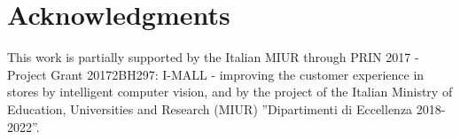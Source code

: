 \documentclass[a4paper,conference]{IEEEtran}
\begin{document}
 \section{Acknowledgments}
\vspace{-0.1cm}
This work is partially supported by the Italian MIUR through PRIN 2017 - Project Grant 20172BH297: I-MALL - improving the customer experience in stores by intelligent computer vision, and  by  the  project  of  the  Italian  Ministry  of  Education,  Universities  and  Research  (MIUR)  ”Dipartimenti  di  Eccellenza  2018-2022”. 











\end{document}

